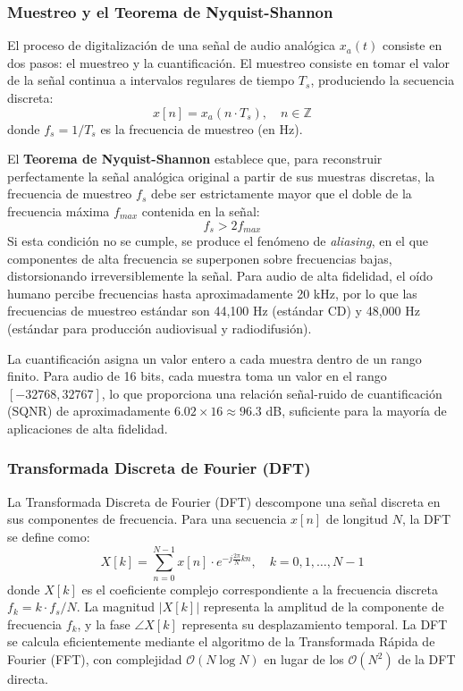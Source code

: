 \subsubsection{Muestreo y el Teorema de Nyquist-Shannon}

El proceso de digitalización de una señal de audio analógica $x_a(t)$ consiste en dos pasos: el muestreo y la cuantificación. El muestreo consiste en tomar el valor de la señal continua a intervalos regulares de tiempo $T_s$, produciendo la secuencia discreta:
\begin{equation}
    x[n] = x_a(n \cdot T_s), \quad n \in \mathbb{Z}
\end{equation}
donde $f_s = 1/T_s$ es la frecuencia de muestreo (en Hz).

El \textbf{Teorema de Nyquist-Shannon} establece que, para reconstruir perfectamente la señal analógica original a partir de sus muestras discretas, la frecuencia de muestreo $f_s$ debe ser estrictamente mayor que el doble de la frecuencia máxima $f_{max}$ contenida en la señal:
\begin{equation}
    f_s > 2 f_{max}
\end{equation}
Si esta condición no se cumple, se produce el fenómeno de \textit{aliasing}, en el que componentes de alta frecuencia se superponen sobre frecuencias bajas, distorsionando irreversiblemente la señal. Para audio de alta fidelidad, el oído humano percibe frecuencias hasta aproximadamente 20 kHz, por lo que las frecuencias de muestreo estándar son 44,100 Hz (estándar CD) y 48,000 Hz (estándar para producción audiovisual y radiodifusión).

La cuantificación asigna un valor entero a cada muestra dentro de un rango finito. Para audio de 16 bits, cada muestra toma un valor en el rango $[-32768, 32767]$, lo que proporciona una relación señal-ruido de cuantificación (SQNR) de aproximadamente $6.02 \times 16 \approx 96.3$ dB, suficiente para la mayoría de aplicaciones de alta fidelidad.

\subsubsection{Transformada Discreta de Fourier (DFT)}

La Transformada Discreta de Fourier (DFT) descompone una señal discreta en sus componentes de frecuencia. Para una secuencia $x[n]$ de longitud $N$, la DFT se define como:
\begin{equation}
    X[k] = \sum_{n=0}^{N-1} x[n] \cdot e^{-j\frac{2\pi}{N}kn}, \quad k = 0, 1, \ldots, N-1
\end{equation}
donde $X[k]$ es el coeficiente complejo correspondiente a la frecuencia discreta $f_k = k \cdot f_s / N$. La magnitud $|X[k]|$ representa la amplitud de la componente de frecuencia $f_k$, y la fase $\angle X[k]$ representa su desplazamiento temporal. La DFT se calcula eficientemente mediante el algoritmo de la Transformada Rápida de Fourier (FFT), con complejidad $\mathcal{O}(N \log N)$ en lugar de los $\mathcal{O}(N^2)$ de la DFT directa.

